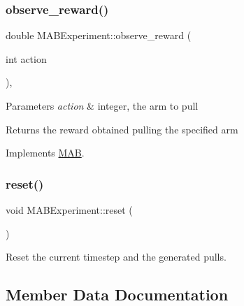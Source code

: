 \mbox{\label{class_m_a_b_experiment_acf2ca557df3d30325d8ff180c223a54a}} 
\subsubsection{\texorpdfstring{observe\+\_\+reward()}{observe\_reward()}}
{\footnotesize\ttfamily double M\+A\+B\+Experiment\+::observe\+\_\+reward (\begin{DoxyParamCaption}\item[{int}]{action }\end{DoxyParamCaption})\hspace{0.3cm}{\ttfamily [override]}, {\ttfamily [virtual]}}


\begin{DoxyParams}{Parameters}
{\em action} & integer, the arm to pull \\
\hline
\end{DoxyParams}
\begin{DoxyReturn}{Returns}
the reward obtained pulling the specified arm 
\end{DoxyReturn}


Implements \mbox{\hyperlink{class_m_a_b_a83c6ba499e761ea4a246aa7bb790eb46}{M\+AB}}.

\mbox{\label{class_m_a_b_experiment_a8fda8c3d5f6b58751243d59b86cc4f07}} 
\subsubsection{\texorpdfstring{reset()}{reset()}}
{\footnotesize\ttfamily void M\+A\+B\+Experiment\+::reset (\begin{DoxyParamCaption}{ }\end{DoxyParamCaption})}



Reset the current timestep and the generated pulls. 



\subsection{Member Data Documentation}
\mbox{\label{class_m_a_b_experiment_abcea657cec661467e38422059dbd4a2d}} 
